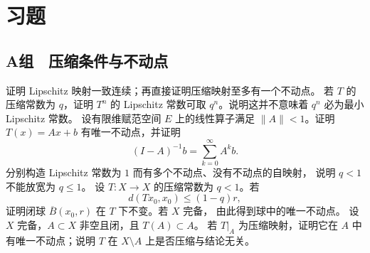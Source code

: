 \section*{习题}

\subsection*{A组　压缩条件与不动点}
\begin{enumerate}[label=\textbf{\thechapter.\arabic*.}]
 证明 Lipschitz 映射一致连续；再直接证明压缩映射至多有一个不动点。
 若 \(T\) 的压缩常数为 \(q\)，证明 \(T^n\) 的 Lipschitz 常数可取
 \(q^n\)。说明这并不意味着 \(q^n\) 必为最小 Lipschitz 常数。
 设有限维赋范空间 \(E\) 上的线性算子满足 \(\|A\|<1\)。证明
 \(T(x)=Ax+b\) 有唯一不动点，并证明
 \[
  (I-A)^{-1}b=\sum_{k=0}^{\infty}A^kb.
 \]
 分别构造 Lipschitz 常数为 \(1\) 而有多个不动点、没有不动点的自映射，
 说明 \(q<1\) 不能放宽为 \(q\le1\)。
 设 \(T:X\to X\) 的压缩常数为 \(q<1\)。若
 \[
  d(Tx_0,x_0)\le(1-q)r,
 \]
 证明闭球 \(\overline B(x_0,r)\) 在 \(T\) 下不变。若 \(X\) 完备，
 由此得到球中的唯一不动点。
 设 \(X\) 完备，\(A\subset X\) 非空且闭，且 \(T(A)\subset A\)。
 若 \(T|_A\) 为压缩映射，证明它在 \(A\) 中有唯一不动点；说明
 \(T\) 在 \(X\setminus A\) 上是否压缩与结论无关。
\end{enumerate}

